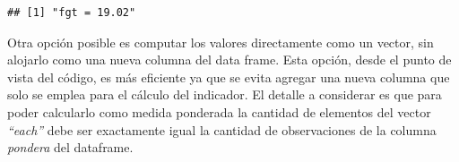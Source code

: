 \documentclass[
]{book}
\newenvironment{Shaded}{\begin{snugshade}}{\end{snugshade}}
\newcommand{\AttributeTok}[1]{\textcolor[rgb]{0.77,0.63,0.00}{#1}}
\newcommand{\CommentTok}[1]{\textcolor[rgb]{0.56,0.35,0.01}{\textit{#1}}}
\newcommand{\ConstantTok}[1]{\textcolor[rgb]{0.00,0.00,0.00}{#1}}
\newcommand{\DecValTok}[1]{\textcolor[rgb]{0.00,0.00,0.81}{#1}}
\newcommand{\FloatTok}[1]{\textcolor[rgb]{0.00,0.00,0.81}{#1}}
\newcommand{\FunctionTok}[1]{\textcolor[rgb]{0.00,0.00,0.00}{#1}}
\newcommand{\NormalTok}[1]{#1}
\newcommand{\OtherTok}[1]{\textcolor[rgb]{0.56,0.35,0.01}{#1}}
\newcommand{\SpecialCharTok}[1]{\textcolor[rgb]{0.00,0.00,0.00}{#1}}
\newcommand{\StringTok}[1]{\textcolor[rgb]{0.31,0.60,0.02}{#1}}
\begin{document}
\begin{Shaded}
\end{Shaded}

\begin{verbatim}
## [1] "fgt = 19.02"
\end{verbatim}

Otra opción posible es computar los valores directamente como un vector, sin alojarlo como una nueva columna del data frame. Esta opción, desde el punto de vista del código, es más eficiente ya que se evita agregar una nueva columna que solo se emplea para el cálculo del indicador. El detalle a considerar es que para poder calcularlo como medida ponderada la cantidad de elementos del vector \emph{``each''} debe ser exactamente igual la cantidad de observaciones de la columna \emph{pondera} del dataframe.
\end{document}
